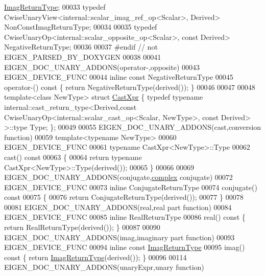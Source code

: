 \begin{DoxyCode}
      \hyperlink{group___core___module_class_eigen_1_1_cwise_unary_op}{ImagReturnType};
00033 \textcolor{keyword}{typedef} CwiseUnaryView<internal::scalar\_imag\_ref\_op<Scalar>, Derived> NonConstImagReturnType;
00034 
00035 \textcolor{keyword}{typedef} CwiseUnaryOp<internal::scalar\_opposite\_op<Scalar>, \textcolor{keyword}{const} Derived> NegativeReturnType;
00036 
00037 \textcolor{preprocessor}{#endif // not EIGEN\_PARSED\_BY\_DOXYGEN}
00038 
00041 EIGEN\_DOC\_UNARY\_ADDONS(\textcolor{keyword}{operator}-,opposite)
00043 EIGEN\_DEVICE\_FUNC
00044 \textcolor{keyword}{inline} \textcolor{keyword}{const} NegativeReturnType
00045 operator-()\textcolor{keyword}{ const }\{ \textcolor{keywordflow}{return} NegativeReturnType(derived()); \}
00046 
00047 
00048 \textcolor{keyword}{template}<\textcolor{keyword}{class} NewType> \textcolor{keyword}{struct }\hyperlink{struct_cast_xpr}{CastXpr} \{ \textcolor{keyword}{typedef} \textcolor{keyword}{typename} internal::cast\_return\_type<Derived,const
       CwiseUnaryOp<internal::scalar\_cast\_op<Scalar, NewType>, \textcolor{keyword}{const} Derived> >::type Type; \};
00049 
00055 EIGEN\_DOC\_UNARY\_ADDONS(cast,conversion \textcolor{keyword}{function})
00059 \textcolor{keyword}{template}<\textcolor{keyword}{typename} NewType>
00060 EIGEN\_DEVICE\_FUNC
00061 \textcolor{keyword}{typename} CastXpr<NewType>::Type
00062 cast()\textcolor{keyword}{ const}
00063 \textcolor{keyword}{}\{
00064   \textcolor{keywordflow}{return} \textcolor{keyword}{typename} CastXpr<NewType>::Type(derived());
00065 \}
00066 
00069 EIGEN\_DOC\_UNARY\_ADDONS(conjugate,\hyperlink{structcomplex}{complex} conjugate)
00072 EIGEN\_DEVICE\_FUNC
00073 \textcolor{keyword}{inline} ConjugateReturnType
00074 conjugate()\textcolor{keyword}{ const}
00075 \textcolor{keyword}{}\{
00076   \textcolor{keywordflow}{return} ConjugateReturnType(derived());
00077 \}
00078 
00081 EIGEN\_DOC\_UNARY\_ADDONS(real,real part \textcolor{keyword}{function})
00084 EIGEN\_DEVICE\_FUNC
00085 \textcolor{keyword}{inline} RealReturnType
00086 real()\textcolor{keyword}{ const }\{ \textcolor{keywordflow}{return} RealReturnType(derived()); \}
00087 
00090 EIGEN\_DOC\_UNARY\_ADDONS(imag,imaginary part \textcolor{keyword}{function})
00093 EIGEN\_DEVICE\_FUNC
00094 \textcolor{keyword}{inline} \textcolor{keyword}{const} \hyperlink{group___core___module_class_eigen_1_1_cwise_unary_op}{ImagReturnType}
00095 imag()\textcolor{keyword}{ const }\{ \textcolor{keywordflow}{return} \hyperlink{group___core___module_class_eigen_1_1_cwise_unary_op}{ImagReturnType}(derived()); \}
00096 
00114 EIGEN\_DOC\_UNARY\_ADDONS(unaryExpr,unary \textcolor{keyword}{function})

\end{DoxyCode}
